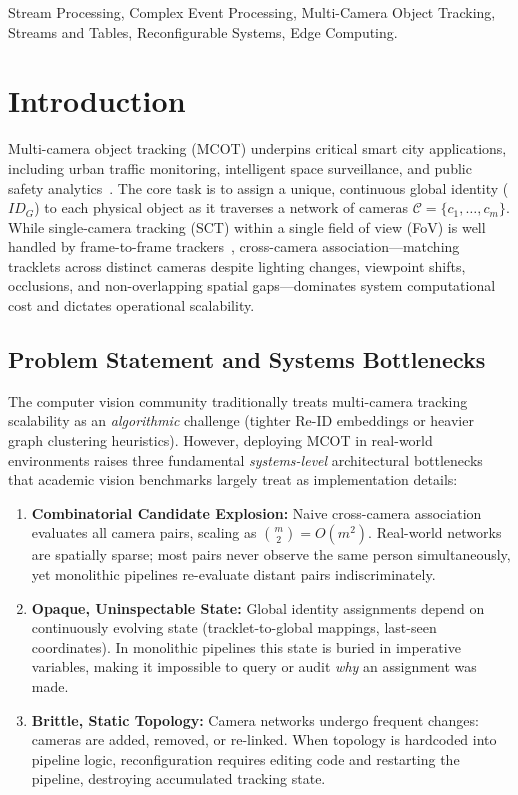 \documentclass[conference]{IEEEtran}
\begin{document}
\begin{IEEEkeywords}
Stream Processing, Complex Event Processing, Multi-Camera Object Tracking, Streams and Tables, Reconfigurable Systems, Edge Computing.
\end{IEEEkeywords}

\section{Introduction}
\label{sec:intro}
Multi-camera object tracking (MCOT) underpins critical smart city applications, including urban traffic monitoring, intelligent space surveillance, and public safety analytics~\cite{yoshida2024overlap,kim2024cluster,xie2024robust}. The core task is to assign a unique, continuous global identity ($ID_G$) to each physical object as it traverses a network of cameras $\mathcal{C} = \{c_1,\dots,c_m\}$. While single-camera tracking (SCT) within a single field of view (FoV) is well handled by frame-to-frame trackers~\cite{yoshida2024overlap,Wojke2017_deepsort,zhang2022bytetrack}, cross-camera association---matching tracklets across distinct cameras despite lighting changes, viewpoint shifts, occlusions, and non-overlapping spatial gaps---dominates system computational cost and dictates operational scalability.

\subsection{Problem Statement and Systems Bottlenecks}
The computer vision community traditionally treats multi-camera tracking scalability as an \emph{algorithmic} challenge (tighter Re-ID embeddings or heavier graph clustering heuristics). However, deploying MCOT in real-world environments raises three fundamental \emph{systems-level} architectural bottlenecks that academic vision benchmarks largely treat as implementation details:
\begin{enumerate}
    \item \textbf{Combinatorial Candidate Explosion:} Naive cross-camera association evaluates all camera pairs, scaling as $\binom{m}{2} = O(m^2)$. Real-world networks are spatially sparse; most pairs never observe the same person simultaneously, yet monolithic pipelines re-evaluate distant pairs indiscriminately.
    \item \textbf{Opaque, Uninspectable State:} Global identity assignments depend on continuously evolving state (tracklet-to-global mappings, last-seen coordinates). In monolithic pipelines this state is buried in imperative variables, making it impossible to query or audit \emph{why} an assignment was made.
    \item \textbf{Brittle, Static Topology:} Camera networks undergo frequent changes: cameras are added, removed, or re-linked. When topology is hardcoded into pipeline logic, reconfiguration requires editing code and restarting the pipeline, destroying accumulated tracking state.
\end{enumerate}
\end{document}

